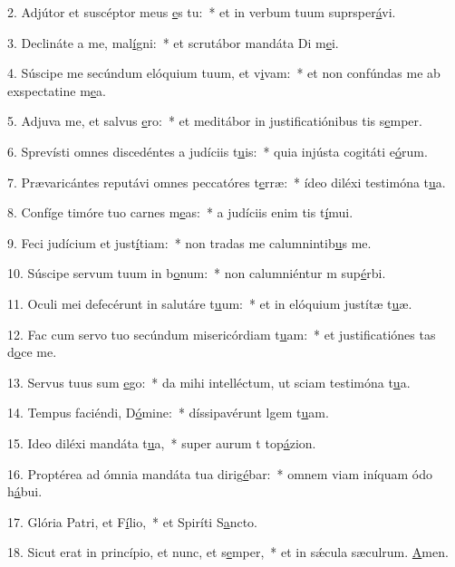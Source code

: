 2. Adjútor et suscéptor meus \uline{e}s tu:~* et in verbum tuum suprsper\uline{á}vi.\par 
3. Declináte a me, mal\uline{í}gni:~* et scrutábor mandáta Di m\uline{e}i.\par 
4. Súscipe me secúndum elóquium tuum, et v\uline{i}vam:~* et non confúndas me ab exspectatine m\uline{e}a.\par 
5. Adjuva me, et salvus \uline{e}ro:~* et meditábor in justificatiónibus tis s\uline{e}mper.\par 
6. Sprevísti omnes discedéntes a judíciis t\uline{u}is:~* quia injústa cogitáti e\uline{ó}rum.\par 
7. Prævaricántes reputávi omnes peccatóres t\uline{e}rræ:~* ídeo diléxi testimóna t\uline{u}a.\par 
8. Confíge timóre tuo carnes m\uline{e}as:~* a judíciis enim tis t\uline{í}mui.\par 
9. Feci judícium et just\uline{í}tiam:~* non tradas me calumnintib\uline{u}s me.\par 
10. Súscipe servum tuum in b\uline{o}num:~* non calumniéntur m sup\uline{é}rbi.\par 
11. Oculi mei defecérunt in salutáre t\uline{u}um:~* et in elóquium justítæ t\uline{u}æ.\par 
12. Fac cum servo tuo secúndum misericórdiam t\uline{u}am:~* et justificatiónes tas d\uline{o}ce me.\par 
13. Servus tuus sum \uline{e}go:~* da mihi intelléctum, ut sciam testimóna t\uline{u}a.\par 
14. Tempus faciéndi, D\uline{ó}mine:~* díssipavérunt lgem t\uline{u}am.\par 
15. Ideo diléxi mandáta t\uline{u}a,~* super aurum t top\uline{á}zion.\par 
16. Proptérea ad ómnia mandáta tua dirig\uline{é}bar:~* omnem viam iníquam ódo h\uline{á}bui.\par 
17. Glória Patri, et F\uline{í}lio,~* et Spiríti S\uline{a}ncto.\par 
18. Sicut erat in princípio, et nunc, et s\uline{e}mper,~* et in sǽcula sæculrum. \uline{A}men.\par 
